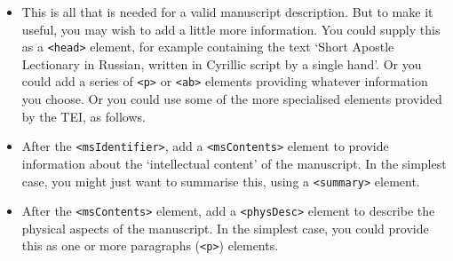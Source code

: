 \documentclass[11pt,twoside]{article}\makeatletter
\begin{document}
\begin{itemize}
\begin{itemize}
\end{itemize} 
\item This is all that is needed for a valid manuscript description. But to make it useful, you may wish to add a little more information. You could supply this as a \texttt{<head>} element, for example containing the text ‘Short Apostle Lectionary in Russian, written in Cyrillic script by a single hand’. Or you could add a series of \texttt{<p>} or \texttt{<ab>} elements providing whatever information you choose. Or you could use some of the more specialised elements provided by the TEI, as follows.
\item After the \texttt{<msIdentifier>}, add a \texttt{<msContents>} element to provide information about the ‘intellectual content’ of the manuscript. In the simplest case, you might just want to summarise this, using a \texttt{<summary>} element.
\item After the \texttt{<msContents>} element, add a \texttt{<physDesc>} element to describe the physical aspects of the manuscript. In the simplest case, you could provide this as one or more paragraphs (\texttt{<p>}) elements.
\end{itemize} \par
\end{document}
